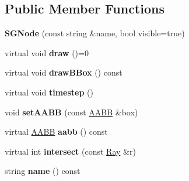 \subsection*{Public Member Functions}
\begin{DoxyCompactItemize}
\item 
\hypertarget{classps_1_1scene_1_1SGNode_a0d163b007bfe81737ecca9136817d0ee}{}{\bfseries S\+G\+Node} (const string \&name, bool visible=true)\label{classps_1_1scene_1_1SGNode_a0d163b007bfe81737ecca9136817d0ee}

\item 
\hypertarget{classps_1_1scene_1_1SGNode_a6e75d7d271c4a97084561a01b1861061}{}virtual void {\bfseries draw} ()=0\label{classps_1_1scene_1_1SGNode_a6e75d7d271c4a97084561a01b1861061}

\item 
\hypertarget{classps_1_1scene_1_1SGNode_a0d3ba806dc24ec372352f72b3eb1cd1d}{}virtual void {\bfseries draw\+B\+Box} () const \label{classps_1_1scene_1_1SGNode_a0d3ba806dc24ec372352f72b3eb1cd1d}

\item 
\hypertarget{classps_1_1scene_1_1SGNode_a098937b04b4eb9ca87e592406c103c5b}{}virtual void {\bfseries timestep} ()\label{classps_1_1scene_1_1SGNode_a098937b04b4eb9ca87e592406c103c5b}

\item 
\hypertarget{classps_1_1scene_1_1SGNode_a77853b8d93bc3aa8d38ef2ca74cb953f}{}void {\bfseries set\+A\+A\+B\+B} (const \hyperlink{classps_1_1base_1_1AABB}{A\+A\+B\+B} \&box)\label{classps_1_1scene_1_1SGNode_a77853b8d93bc3aa8d38ef2ca74cb953f}

\item 
\hypertarget{classps_1_1scene_1_1SGNode_ab400b91c61a9f06439fa5681f9184736}{}virtual \hyperlink{classps_1_1base_1_1AABB}{A\+A\+B\+B} {\bfseries aabb} () const \label{classps_1_1scene_1_1SGNode_ab400b91c61a9f06439fa5681f9184736}

\item 
\hypertarget{classps_1_1scene_1_1SGNode_af5efe8ab82d5a51cb5175f8bb56a5a15}{}virtual int {\bfseries intersect} (const \hyperlink{classps_1_1base_1_1Ray}{Ray} \&r)\label{classps_1_1scene_1_1SGNode_af5efe8ab82d5a51cb5175f8bb56a5a15}

\item 
\hypertarget{classps_1_1scene_1_1SGNode_a778d3daa84907e37f48e600fb0cc5301}{}string {\bfseries name} () const \label{classps_1_1scene_1_1SGNode_a778d3daa84907e37f48e600fb0cc5301}


\end{DoxyCompactItemize}
